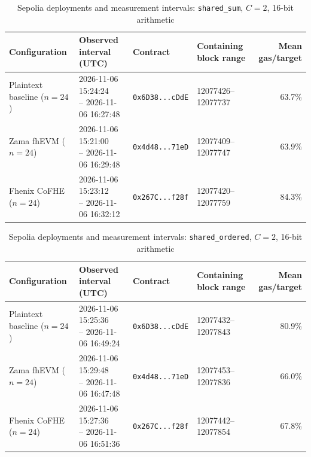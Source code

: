 \begin{table}[!t]
\caption{Sepolia deployments and measurement intervals: \texttt{shared\_sum}, \(C=2\), 16-bit arithmetic}
\label{tab:sepolia-experiment-deployments-concurrency-euint16-concurrency-w16-c2-shared-sum}
\centering
\footnotesize
\setlength{\tabcolsep}{4pt}
\begin{tabular}{|l|l|l|l|r|}
\hline
\textbf{Configuration} &
\textbf{Observed interval (UTC)} &
\textbf{Contract} &
\textbf{Containing block range} &
\textbf{Mean gas/target} \\
\hline
Plaintext baseline (\(n=24\)) &
\shortstack[l]{2026-11-06 15:24:24 \\ -- 2026-11-06 16:27:48} &
\texttt{0x6D38...cDdE} &
12077426--12077737 &
63.7\% \\
\hline
Zama fhEVM (\(n=24\)) &
\shortstack[l]{2026-11-06 15:21:00 \\ -- 2026-11-06 16:29:48} &
\texttt{0x4d48...71eD} &
12077409--12077747 &
63.9\% \\
\hline
Fhenix CoFHE (\(n=24\)) &
\shortstack[l]{2026-11-06 15:23:12 \\ -- 2026-11-06 16:32:12} &
\texttt{0x267C...f28f} &
12077420--12077759 &
84.3\% \\
\hline
\end{tabular}
\end{table}

\begin{table}[!t]
\caption{Sepolia deployments and measurement intervals: \texttt{shared\_ordered}, \(C=2\), 16-bit arithmetic}
\label{tab:sepolia-experiment-deployments-concurrency-euint16-concurrency-w16-c2-shared-ordered}
\centering
\footnotesize
\setlength{\tabcolsep}{4pt}
\begin{tabular}{|l|l|l|l|r|}
\hline
\textbf{Configuration} &
\textbf{Observed interval (UTC)} &
\textbf{Contract} &
\textbf{Containing block range} &
\textbf{Mean gas/target} \\
\hline
Plaintext baseline (\(n=24\)) &
\shortstack[l]{2026-11-06 15:25:36 \\ -- 2026-11-06 16:49:24} &
\texttt{0x6D38...cDdE} &
12077432--12077843 &
80.9\% \\
\hline
Zama fhEVM (\(n=24\)) &
\shortstack[l]{2026-11-06 15:29:48 \\ -- 2026-11-06 16:47:48} &
\texttt{0x4d48...71eD} &
12077453--12077836 &
66.0\% \\
\hline
Fhenix CoFHE (\(n=24\)) &
\shortstack[l]{2026-11-06 15:27:36 \\ -- 2026-11-06 16:51:36} &
\texttt{0x267C...f28f} &
12077442--12077854 &
67.8\% \\
\hline
\end{tabular}
\end{table}
